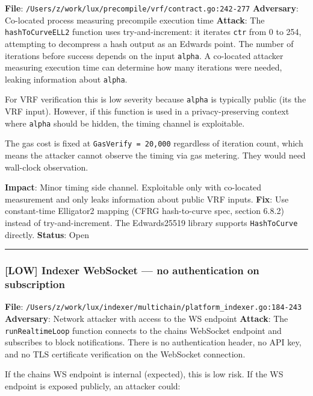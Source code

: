 \documentclass[
]{article}
\begin{document}
\textbf{File}:
\texttt{/Users/z/work/lux/precompile/vrf/contract.go:242-277}
\textbf{Adversary}: Co-located process measuring precompile execution
time \textbf{Attack}: The \texttt{hashToCurveELL2} function uses
try-and-increment: it iterates \texttt{ctr} from 0 to 254, attempting to
decompress a hash output as an Edwards point. The number of iterations
before success depends on the input \texttt{alpha}. A co-located
attacker measuring execution time can determine how many iterations were
needed, leaking information about \texttt{alpha}.

For VRF verification this is low severity because \texttt{alpha} is
typically public (it\textquotesingle s the VRF input). However, if this
function is used in a privacy-preserving context where \texttt{alpha}
should be hidden, the timing channel is exploitable.

The gas cost is fixed at \texttt{GasVerify\ =\ 20,000} regardless of
iteration count, which means the attacker cannot observe the timing via
gas metering. They would need wall-clock observation.

\textbf{Impact}: Minor timing side channel. Exploitable only with
co-located measurement and only leaks information about public VRF
inputs. \textbf{Fix}: Use constant-time Elligator2 mapping (CFRG
hash-to-curve spec, section 6.8.2) instead of try-and-increment. The
Edwards25519 library supports \texttt{HashToCurve} directly.
\textbf{Status}: Open

\begin{center}\rule{0.5\linewidth}{0.5pt}\end{center}

\subsubsection{{[}LOW{]} Indexer WebSocket --- no authentication on
subscription}\label{low-indexer-websocket--no-authentication-on-subscription}

\textbf{File}:
\texttt{/Users/z/work/lux/indexer/multichain/platform\_indexer.go:184-243}
\textbf{Adversary}: Network attacker with access to the WS endpoint
\textbf{Attack}: The \texttt{runRealtimeLoop} function connects to the
chain\textquotesingle s WebSocket endpoint and subscribes to block
notifications. There is no authentication header, no API key, and no TLS
certificate verification on the WebSocket connection.

If the chain\textquotesingle s WS endpoint is internal (expected), this
is low risk. If the WS endpoint is exposed publicly, an attacker could:
\end{document}
